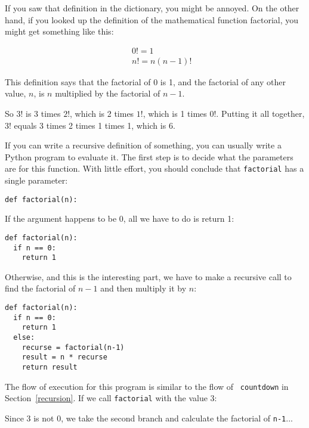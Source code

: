 If you saw that definition in the dictionary, you might be annoyed. On
the other hand, if you looked up the definition of the mathematical
function factorial, you might get something like this:

\vspace{-0.35in}
\begin{eqnarray*}
&&  0! = 1 \\
&&  n! = n (n-1)!
\end{eqnarray*}
\vspace{-0.25in}

This definition says that the factorial of 0 is 1, and the factorial
of any other value, $n$, is $n$ multiplied by the factorial of $n-1$.

So $3!$ is 3 times $2!$, which is 2 times $1!$, which is 1 times
$0!$. Putting it all together, $3!$ equals 3 times 2 times 1 times 1,
which is 6.


If you can write a recursive definition of something, you can usually
write a Python program to evaluate it. The first step is to decide
what the parameters are for this function.  With little effort, you
should conclude that {\tt factorial} has a single parameter:

\beforeverb
\begin{verbatim}
def factorial(n):
\end{verbatim}
\afterverb
%
If the argument happens to be 0, all we have to do is return 1:

\beforeverb
\begin{verbatim}
def factorial(n):
  if n == 0:
    return 1
\end{verbatim}
\afterverb
%
Otherwise, and this is the interesting part, we have to make a
recursive call to find the factorial of $n-1$ and then multiply it by
$n$:

\beforeverb
\begin{verbatim}
def factorial(n):
  if n == 0:
    return 1
  else:
    recurse = factorial(n-1)
    result = n * recurse
    return result
\end{verbatim}
\afterverb
%
The flow of execution for this program is similar to the flow of {\tt
countdown} in Section~\ref{recursion}.  If we call {\tt factorial} with the
value 3:


Since 3 is not 0, we take the second branch and calculate the factorial
of {\tt n-1}...

